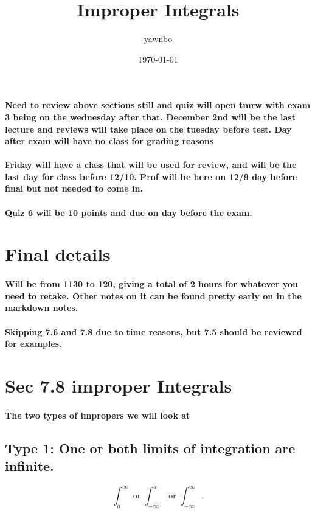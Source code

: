\documentclass[a4paper]{article}
\title{Improper Integrals}
\author{yawnbo}
\date{\today}
\begin{document}
\paragraph{Need to review above sections still and quiz will open tmrw with exam 3 being on the wednesday after that. December 2nd will be the last lecture and reviews will take place on the tuesday before test. Day after exam will have no class for grading reasons}

\paragraph{Friday will have a class that will be used for review, and will be the last day for class before 12/10. Prof will be here on 12/9 day before final but not needed to come in.}
\paragraph{Quiz 6 will be 10 points and due on day before the exam.}

\section{Final details}%
\label{sec:Final details}

\paragraph{Will be from 1130 to 120, giving a total of 2 hours for whatever you need to retake. Other notes on it can be found pretty early on in the markdown notes. }

\paragraph{Skipping 7.6 and 7.8 due to time reasons, but 7.5 should be reviewed for examples.}

\section{Sec 7.8 improper Integrals}%
\label{sec:Sec 7.8 improper Integrals}
\paragraph{The two types of impropers we will look at}
\subsection{Type 1: One or both limits of integration are infinite.}%
\label{sub:Type 1: One or both limits of integration are infinite.}
\[
\int_{a}^{\infty} \text{ or } \int_{-\infty}^{a} \text{ or }\int_{-\infty}^{\infty}
.\] 
\end{document}
